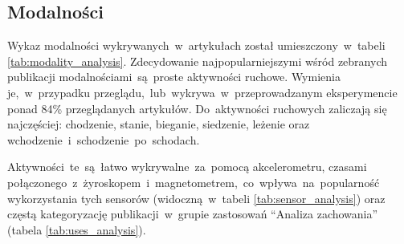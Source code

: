 \subsection{Modalności}
\label{base_modalities}
Wykaz modalności wykrywanych~w~artykułach został umieszczony~w~tabeli \ref{tab:modality_analysis}. Zdecydowanie najpopularniejszymi wśród zebranych publikacji modalnościami~są~proste aktywności ruchowe. Wymienia je,~w~przypadku przeglądu,~lub~wykrywa~w~przeprowadzanym eksperymencie ponad 84\% przeglądanych artykułów. Do~aktywności ruchowych zaliczają się najczęściej: chodzenie, stanie, bieganie, siedzenie, leżenie oraz wchodzenie~i~schodzenie~po~schodach.

Aktywności~te~są~łatwo wykrywalne~za~pomocą akcelerometru, czasami połączonego~z~żyroskopem~i~magnetometrem,~co~wpływa~na~popularność wykorzystania tych sensorów (widoczną~w~tabeli \ref{tab:sensor_analysis}) oraz częstą kategoryzację publikacji~w~grupie zastosowań ``Analiza zachowania'' (tabela \ref{tab:uses_analysis}).


